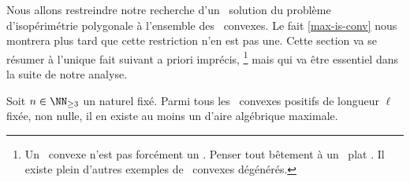 Nous allons restreindre notre recherche d'un \ngone\ solution du problème d'isopérimétrie polygonale à l'ensemble des \ngones\ convexes. Le fait \ref{max-is-conv} nous montrera plus tard que cette restriction n'en est pas une. 
Cette section va se résumer à l'unique fait suivant a priori imprécis,%
\footnote{
    Un \ncycle\ convexe n'est pas forcément un \ngone. Penser tout bêtement à un \ncycle\ \og plat \fg.
    Il existe plein d'autres exemples de \ncycles\ convexes dégénérés.
}
mais qui va être essentiel dans la suite de notre analyse.




\begin{fact} \label{at-least-one}
    Soit $n \in \NN_{\geq3}$ un naturel fixé.
    Parmi tous les \ncycles\ convexes positifs de longueur $\ell$ fixée, non nulle, il en existe au moins un d'aire algébrique maximale.
\end{fact}


